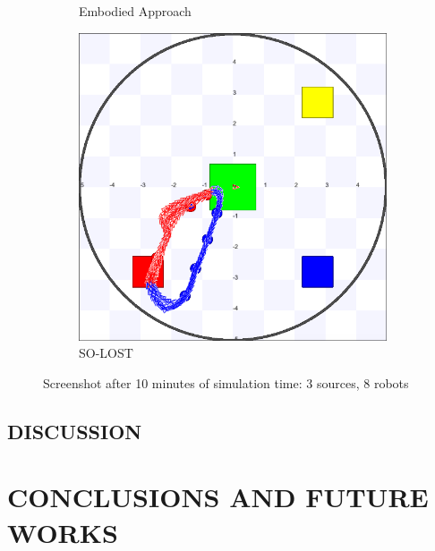 \documentclass[letterpaper, 10 pt, conference]{ieeeconf}  %
\begin{document}
\begin{figure}[h]
\begin{subfigure}{.25\textwidth}
          \centering
          \caption{Embodied Approach}
     \end{subfigure}
    \centering
     \begin{subfigure}{.25\textwidth}
       \includegraphics[width=0.9\linewidth]{images/so-lost/3/raw/8.png}
          \centering
          \caption{SO-LOST}
     \end{subfigure}
   
   \centering
   \caption{Screenshot after 10 minutes of simulation time: 3 sources, 8 robots}
   \label{fig:screenshot_3_source}
\end{figure}

\subsection{DISCUSSION}



\section{CONCLUSIONS AND FUTURE WORKS}
\end{document}
